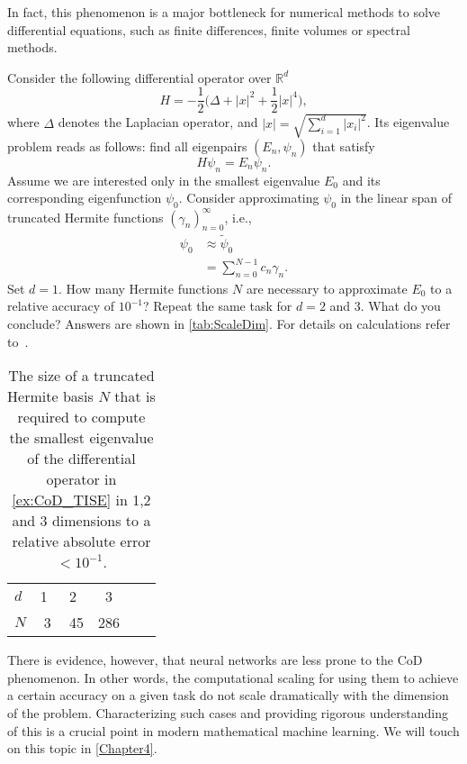 In fact, this phenomenon is a major bottleneck for numerical methods to solve
differential equations, such as finite differences, finite volumes or spectral
methods. 
\begin{boxedexample} {\theexample}
    \label{ex:CoD_TISE}
Consider the following differential operator over $\mathbb{R}^d$
\begin{equation*}
    H = -\frac{1}{2} \bigl(\Delta + |x|^2 + \frac{1}{2} |x|^4 \bigr), 
\end{equation*}
where $\Delta$ denotes the Laplacian operator, and $|x| = \sqrt{\sum_{i=1}^d |x_i|^2}$. Its eigenvalue problem reads as follows: find all eigenpairs $(E_n, \psi_n)$
that satisfy
\begin{equation*}
    H \psi_n = E_n \psi_n. 
\end{equation*}
Assume we are interested only in the smallest eigenvalue $E_0$ and its
corresponding eigenfunction $\psi_0$. Consider approximating $\psi_0$
in the linear span of truncated Hermite functions $(\gamma_n)_{n=0}^\infty$,
i.e., 
\begin{align*}
    \psi_0 &\approx \tilde{\psi}_0 \\
    &= \sum_{n=0}^{N-1} c_n \gamma_n.
\end{align*}
Set $d=1$. How many Hermite functions $N$ are necessary to approximate $E_0$ to
a relative accuracy of $10^{-1}$? Repeat the same task for $d=2$ and 3. What do you
conclude? Answers are shown in \autoref{tab:ScaleDim}. For details on
calculations refer to~\cite{Saleh:thesis:2023}.
\end{boxedexample}
\begin{table}[t]
	\centering
	\caption[Size of basis to ensure convergence for an increasing problem dimensionality]{The size of a truncated Hermite basis $N$ that is required 
	to compute the smallest eigenvalue of the differential operator in
	\autoref{ex:CoD_TISE} in
	1,2 and 3 dimensions to a relative absolute error $< 10^{-1}$.}
	\begin{tabular}{lccccc}
		\hline\hline
		$d$ &1~&2~ &3		\\
		$N$   & 3 & 45 & 286  \\
		\hline\hline
	\end{tabular}
	\label{tab:ScaleDim}
\end{table}
There is evidence, however, that neural networks are less prone to the CoD
phenomenon. In other words, the computational scaling for using them to achieve
a certain accuracy on a given task do not scale dramatically with the dimension
of the problem. Characterizing such cases and providing rigorous understanding of
this is a crucial point in modern mathematical machine learning. We will touch
on this topic in \autoref{Chapter4}.

